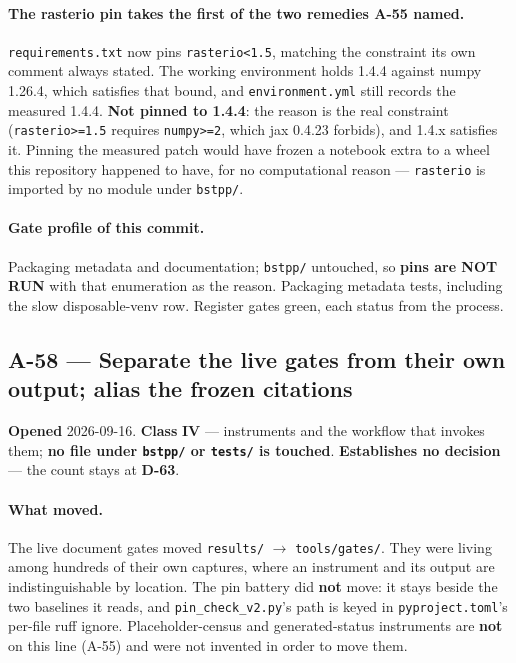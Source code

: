 \documentclass[
  10pt,
]{article}
\begin{document}
\paragraph{The rasterio pin takes the first of the two remedies A-55 named.}
\texttt{requirements.txt} now pins \texttt{rasterio<1.5}, matching the
constraint its own comment always stated. The working environment holds 1.4.4
against numpy 1.26.4, which satisfies that bound, and \texttt{environment.yml}
still records the measured 1.4.4. \textbf{Not pinned to 1.4.4}: the reason is
the real constraint (\texttt{rasterio>=1.5} requires \texttt{numpy>=2}, which
jax 0.4.23 forbids), and 1.4.x satisfies it. Pinning the measured patch would
have frozen a notebook extra to a wheel this repository happened to have, for
no computational reason --- \texttt{rasterio} is imported by no module under
\texttt{bstpp/}.

\paragraph{Gate profile of this commit.}
Packaging metadata and documentation; \texttt{bstpp/} untouched, so
\textbf{pins are NOT RUN} with that enumeration as the reason. Packaging
metadata tests, including the slow disposable-venv row. Register gates green,
each status from the process.

\hypertarget{a-58}{%
\subsection{A-58 --- Separate the live gates from their own output; alias the
frozen citations}\label{a-58}}

\textbf{Opened} 2026-09-16. \textbf{Class} \textbf{IV} --- instruments and the
workflow that invokes them; \textbf{no file under \texttt{bstpp/} or
\texttt{tests/} is touched}. \textbf{Establishes no decision} --- the count
stays at \textbf{D-63}.

\paragraph{What moved.}
The live document gates moved \texttt{results/} $\to$ \texttt{tools/gates/}.
They were living among hundreds of their own captures, where an instrument and
its output are indistinguishable by location. The pin battery did \textbf{not}
move: it stays beside the two baselines it reads, and
\texttt{pin\_check\_v2.py}'s path is keyed in \texttt{pyproject.toml}'s per-file
ruff ignore. Placeholder-census and generated-status instruments are
\textbf{not} on this line (A-55) and were not invented in order to move them.
\end{document}
